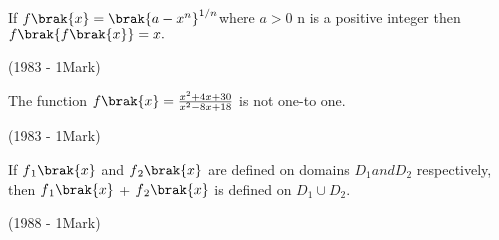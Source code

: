 \iffalse
\title{Assignment}
\author{M.Ranjith}
\section{true-false}
\fi
\item If  $f\brak{x}=\brak{a-x^n}^{1/n}$where $a>0$ n is a positive integer 
then $f\brak{f\brak{x}}=x.$


 \hfill 
 {(1983 - 1Mark)}


 
\item The function $f\brak{x}={\frac{x^2+4x+30}{x^2-8x+18}}$ is not one-to one.


\hfill
{(1983 - 1Mark)}




\item If $f{_1}\brak{x}$
 and  $f{_2}\brak{x}$ are  defined on domains $D{_1} and D{_2}$ respectively, then $f{_1}\brak{x}$ + $f{_2}\brak{x}$ is defined on $D{_1}\cup D{_2}$.


\hfill
{(1988 - 1Mark)}
